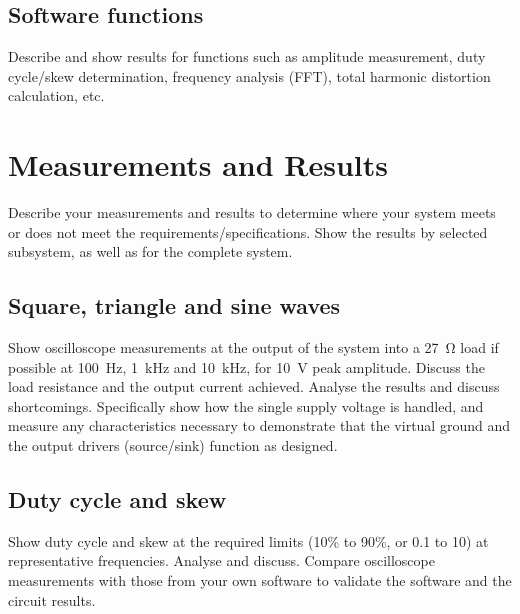 \documentclass[11pt,a4paper]{article}
\begin{document}
\subsection{Software functions}

Describe and show results for functions such as amplitude measurement, duty cycle/skew determination, frequency analysis (FFT), total harmonic distortion calculation, etc.

\newpage
\section{Measurements and Results}

Describe your measurements and results to determine where your system meets or does not meet the requirements/specifications. Show the results by selected subsystem, as well as for the complete system. 

\subsection{Square, triangle and sine waves}

Show oscilloscope measurements at the output of the system into a \SI{27}{\ohm} load if possible at \SI{100}{\hertz}, \SI{1}{\kilo\hertz} and \SI{10}{\kilo\hertz}, for \SI{10}{\volt} peak amplitude. Discuss the load resistance and the output current achieved. Analyse the results and discuss shortcomings. Specifically show how the single supply voltage is handled, and measure any characteristics necessary to demonstrate that the virtual ground and the output drivers (source/sink) function as designed.

\subsection{Duty cycle and skew}

Show duty cycle and skew at the required limits (10\% to 90\%, or 0.1 to 10) at representative frequencies. Analyse and discuss. Compare oscilloscope measurements with those from your own software to validate the software and the circuit results.
\end{document}
